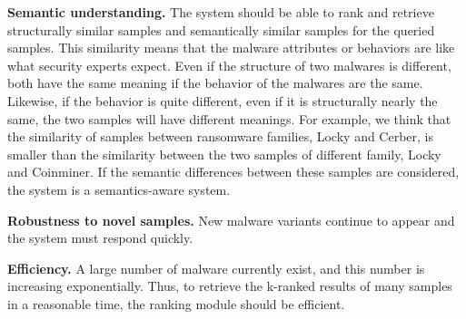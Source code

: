 \textbf{Semantic understanding. }
The system should be able to rank and retrieve structurally similar samples and semantically similar samples for the queried samples. This similarity means that the malware attributes or behaviors are like what security experts expect. Even if the structure of two malwares is different, both have the same meaning if the behavior of the malwares are the same. Likewise, if the behavior is quite different, even if it is structurally nearly the same, the two samples will have different meanings. For example, we think that the similarity of samples between ransomware families, Locky and Cerber, is smaller than the similarity between the two samples of different family, Locky and Coinminer. If the semantic differences between these samples are considered, the system is a semantics-aware system.
 
\textbf{Robustness to novel samples. }
New malware variants continue to appear and the system must respond quickly.

\textbf{Efficiency. }
A large number of malware currently exist, and this number is increasing exponentially. Thus, to retrieve the k-ranked results of many samples in a reasonable time, the ranking module should be efficient.


